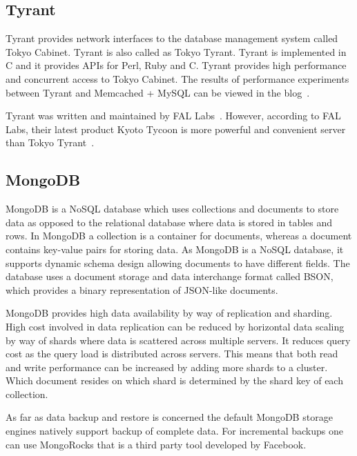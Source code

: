     \pv
     
\subsection{Tyrant}

Tyrant provides network interfaces to the database management system
called Tokyo Cabinet. Tyrant is also called as Tokyo Tyrant. Tyrant is
implemented in C and it provides APIs for Perl, Ruby and C. Tyrant
provides high performance and concurrent access to Tokyo Cabinet. The
results of performance experiments between Tyrant and Memcached +
MySQL can be viewed in the blog~\cite{www-tyrant-blog}.

Tyrant was written and maintained by FAL
Labs~\cite{www-tyrant-fal-labs}.  However, according to FAL Labs,
their latest product Kyoto Tycoon is more powerful and convenient
server than Tokyo Tyrant~\cite{www-kyoto-tycoon}.

     \pv


\subsection{MongoDB}

     MongoDB is a NoSQL database which uses collections and documents
     to store data as opposed to the relational database where data is
     stored in tables and rows. In MongoDB a collection is a container
     for documents, whereas a document contains key-value pairs for
     storing data. As MongoDB is a NoSQL database, it supports dynamic
     schema design allowing documents to have different fields. The
     database uses a document storage and data interchange format
     called BSON, which provides a binary representation of JSON-like
     documents.

     MongoDB provides high data availability by way of replication and
     sharding. High cost involved in data replication can be reduced
     by horizontal data scaling by way of shards where data is
     scattered across multiple servers. It reduces query cost as the
     query load is distributed across servers. This means that both
     read and write performance can be increased by adding more shards
     to a cluster. Which document resides on which shard is determined
     by the shard key of each collection.

     As far as data backup and restore is concerned the default
     MongoDB storage engines natively support backup of complete
     data. For incremental backups one can use MongoRocks that is a
     third party tool developed by Facebook.

